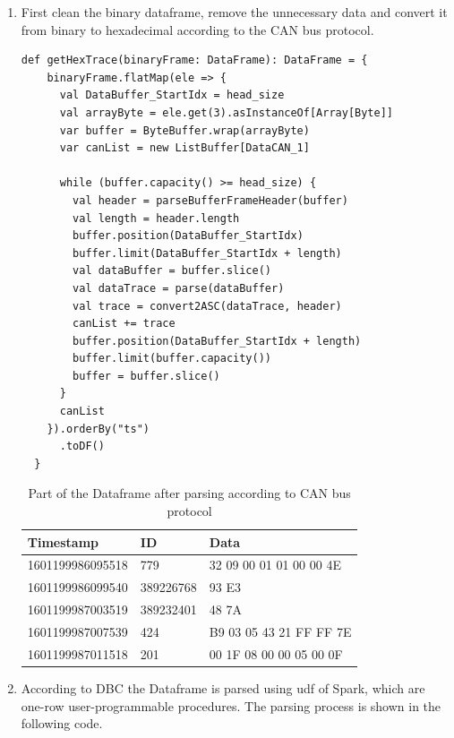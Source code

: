 \begin{enumerate}
\item First clean the binary dataframe, remove the unnecessary data and convert it from binary to hexadecimal according to the CAN bus protocol.

\renewcommand{\lstlistingname}{Code} %
\begin{lstlisting}[caption=Spark: Converting to hexadecimal, style=myScalastyle, label=lst:Converting_hexadecimal]
  def getHexTrace(binaryFrame: DataFrame): DataFrame = {
    binaryFrame.flatMap(ele => {
      val DataBuffer_StartIdx = head_size
      val arrayByte = ele.get(3).asInstanceOf[Array[Byte]]
      var buffer = ByteBuffer.wrap(arrayByte)
      var canList = new ListBuffer[DataCAN_1]

      while (buffer.capacity() >= head_size) {
        val header = parseBufferFrameHeader(buffer)
        val length = header.length
        buffer.position(DataBuffer_StartIdx)
        buffer.limit(DataBuffer_StartIdx + length)
        val dataBuffer = buffer.slice()
        val dataTrace = parse(dataBuffer)
        val trace = convert2ASC(dataTrace, header)
        canList += trace
        buffer.position(DataBuffer_StartIdx + length)
        buffer.limit(buffer.capacity())
        buffer = buffer.slice()
      }
      canList
    }).orderBy("ts")
      .toDF()
  }
\end{lstlisting}

\begin{table}[hbt!]
\centering
\begin{tabular}{|l|l|l|}
\hline
Timestamp        & ID        & Data                    \\ \hline
1601199986095518 & 779       & 32 09 00 01 01 00 00 4E \\ \hline
1601199986099540 & 389226768 & 93 E3                   \\ \hline
1601199987003519 & 389232401 & 48 7A                   \\ \hline
1601199987007539 & 424       & B9 03 05 43 21 FF FF 7E \\ \hline
1601199987011518 & 201       & 00 1F 08 00 00 05 00 0F \\ \hline
\end{tabular}
\caption{Part of the Dataframe after parsing according to CAN bus protocol}
\label{tab:my-table}
\end{table}

\item According to DBC the Dataframe is parsed using \ac{udf} of Spark, which are one-row user-programmable procedures. The parsing process is shown in the following code.


\end{enumerate}
